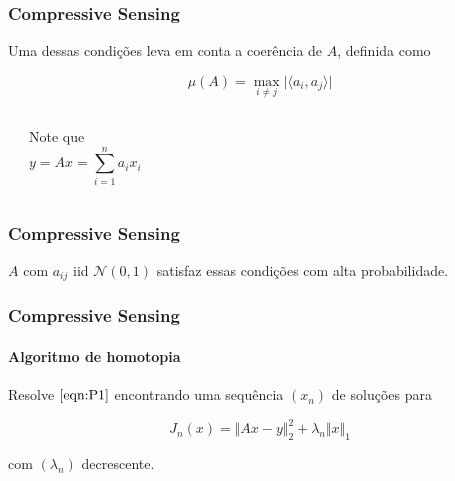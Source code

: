 \documentclass[11pt]{beamer}
\begin{document}
\begin{frame}
\frametitle{Compressive Sensing}
Uma dessas condições leva em conta a coerência de $A$, definida como

$$\mu(A) = \max_{i \neq j} \vert \langle a_i, a_j \rangle \vert$$

\begin{center}
\begin{columns}[t]
\vspace{.5cm}
\begin{center}
\end{center}
\begin{center}
Note que
$$y = Ax = \sum_{i = 1}^n a_i x_i$$
\end{center}
\end{columns}
\end{center}

\end{frame}

\begin{frame}
\frametitle{Compressive Sensing}
$A$ com $a_{ij}$ iid $\mathcal{N}(0,1)$ satisfaz essas condições com alta probabilidade.
\end{frame}

\begin{frame}
\frametitle{Compressive Sensing}
\framesubtitle{Algoritmo de homotopia}
Resolve $\eqref{eqn:P1}$ encontrando uma sequência $(x_n)$ de soluções para

$$J_n(x) = \Vert Ax - y \Vert_2^2 + \lambda_n \Vert x \Vert_1$$

com $(\lambda_n)$ decrescente.
\end{frame}
\end{document}
